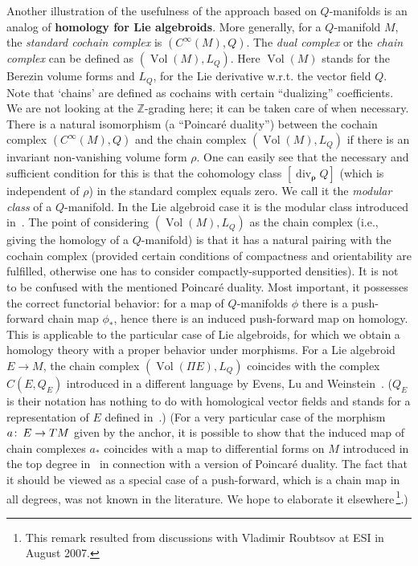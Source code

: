 \documentclass[12pt,reqno,a4paper]{amsart}
\theoremstyle{definition}
\begin{document}
Another illustration of the usefulness of the approach  based on
$Q$-manifolds  is an analog of \textbf{homology  for Lie
algebroids}. More generally, for a $Q$-manifold $M$, the
\textit{standard cochain complex} is $(C^{\infty}(M), Q)$. The
\textit{dual complex} or the \textit{chain complex} can be defined
as $(\operatorname{Vol}(M), L_Q)$.  Here $\operatorname{Vol} (M)$ stands for the Berezin volume
forms and $L_Q$, for the Lie derivative w.r.t. the vector field $Q$.
Note that `chains' are defined as cochains with certain
``dualizing'' coefficients. We are not looking at the
$\mathbb{Z}$-grading here; it can be taken care of when necessary.
There is a natural isomorphism (a ``Poincar{\'{e}} duality'')
between the cochain complex $(C^{\infty}(M), Q)$ and the chain
complex $(\operatorname{Vol}(M), L_Q)$ if there is an invariant non-vanishing
volume form $\rho$. One can easily see that the necessary and
sufficient condition for this is that the cohomology class
$[{\mathop{\mathrm{div}}}_{\boldsymbol{\rho}}Q]$ (which is independent of $\rho$) in
the standard complex equals zero. We call it the \textit{modular
class} of a $Q$-manifold. In the Lie algebroid case it is the
modular class introduced in~\cite{weinstein:evenslu99}. The point of
considering $(\operatorname{Vol}(M), L_Q)$ as the chain complex (i.e., giving the
homology of a $Q$-manifold) is that it has a natural pairing with
the cochain complex (provided certain conditions of compactness and
orientability are fulfilled, otherwise one has to consider
compactly-supported densities). It is not to be confused with the
mentioned  Poincar{\'{e}} duality. Most important, it possesses the
correct functorial behavior: for a map of $Q$-manifolds $\phi$ there
is a push-forward chain map $\phi_*$, hence there is an induced
push-forward map on homology. This is applicable to the particular
case of Lie algebroids, for which we obtain a homology theory with a
proper behavior under morphisms. For a Lie algebroid $E\to M$, the
chain complex $(\operatorname{Vol}(\Pi E), L_Q)$ coincides with the complex
$C(E,Q_E)$ introduced in a different language by Evens, Lu and
Weinstein~\cite{weinstein:evenslu99}. ($Q_E$ is their notation has
nothing to do with homological vector fields and stands for a
representation of $E$ defined in~\cite{weinstein:evenslu99}.) (For a
very particular case of the morphism $a{\colon\thinspace} E\to TM$   given by the
anchor, it is possible to show that the induced map of chain
complexes $a_{*}$ coincides with a map to differential forms on $M$
introduced in the top degree in~\cite{weinstein:evenslu99} in
connection with a version of  Poincar{\'{e}} duality. The fact that
it should be viewed as a special case of a push-forward, which is a
chain map in all degrees, was not known in the literature. We hope
to elaborate it elsewhere\,\footnote{This remark resulted from
discussions with Vladimir Roubtsov at ESI in August 2007.}.)
\end{document}
